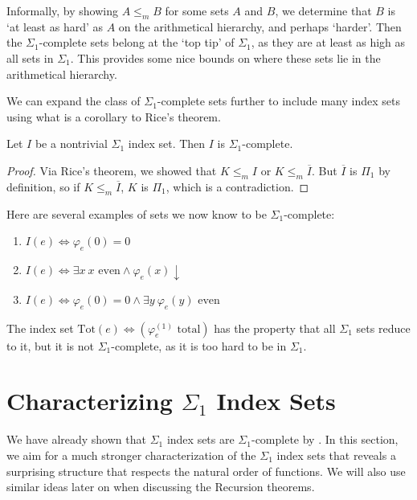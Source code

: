 Informally, by showing $A \leq_m B$ for some sets $A$ and $B$, we determine that $B$ is `at least as hard' as $A$ on the arithmetical hierarchy, and perhaps `harder'. Then the $\Sigma_1$-complete sets belong at the `top tip' of $\Sigma_1$, as they are at least as high as all sets in $\Sigma_1$. This provides some nice bounds on where these sets lie in the arithmetical hierarchy.

We can expand the class of $\Sigma_1$-complete sets further to include many index sets using what is a corollary to Rice's theorem.

\begin{proposition}\label{index-set-complete}
Let $I$ be a nontrivial $\Sigma_1$ index set. Then $I$ is $\Sigma_1$-complete.
\end{proposition}
\begin{proof}
Via Rice's theorem, we showed that $K \leq_m I$ or $K \leq_m \overline{I}$. But $\overline{I}$ is $\Pi_1$ by definition, so if $K \leq_m \overline{I}$, $K$ is $\Pi_1$, which is a contradiction.
\end{proof}

Here are several examples of sets we now know to be $\Sigma_1$-complete:
\begin{enumerate}
    \item $I(e) \iff \varphi_e(0) = 0$
    \item $I(e) \iff \exists x \ x \text{ even} \land \varphi_e(x) \downarrow$
    \item $I(e) \iff \varphi_e(0) = 0 \land \exists y \ \varphi_e(y) \text{ even}$
\end{enumerate}

The index set $\text{Tot}(e) \iff \left(\varphi_e^{(1)} \text{ total}\right)$ has the property that all $\Sigma_1$ sets reduce to it, but it is not $\Sigma_1$-complete, as it is too hard to be in $\Sigma_1$. 

\section{Characterizing $\Sigma_1$ Index Sets}
We have already shown that $\Sigma_1$ index sets are $\Sigma_1$-complete by . In this section, we aim for a much stronger characterization of the $\Sigma_1$ index sets that reveals a surprising structure that respects the natural order of functions. We will also use similar ideas later on when discussing the Recursion theorems.

